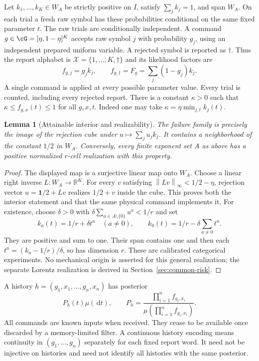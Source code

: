 \documentclass[11pt]{amsart}
\newtheorem{lemma}[theorem]{Lemma}
\theoremstyle{definition}\newtheorem{definition}[theorem]{Definition}
\theoremstyle{remark}\newtheorem{remark}[theorem]{Remark}
\newcommand{\R}{\mathbb R}\newcommand{\N}{\mathbb N}\newcommand{\C}{\mathbb C}
\newcommand{\one}{\mathbf 1}\newcommand{\dd}{\,\mathrm d}
\newcommand{\cX}{\mathcal X}\newcommand{\cS}{\mathcal S}
\newcommand{\norm}[1]{\left\lVert#1\right\rVert}
\begin{document}
Let $k_1,\ldots,k_K\in W_A$ be strictly positive on $I$, satisfy
$\sum_jk_j=1$, and span $W_A$. On each trial a fresh raw symbol has these
probabilities conditional on the same fixed parameter $t$. The raw trials
are conditionally independent. A command
$g\in\cG=[\eta,1-\eta]^K$ accepts raw symbol $j$ with probability $g_j$,
using an independent prepared uniform variable. A rejected symbol is
reported as $\dagger$. Thus the report alphabet is
$\cX=\{1,\ldots,K,\dagger\}$ and its likelihood factors are
\begin{equation}\label{eq:channel}
 f_{g,j}=g_jk_j,\qquad
 f_{g,\dagger}=F_g=\sum_j(1-g_j)k_j.
\end{equation}
A single command is applied at every possible parameter value. Every
trial is counted, including every rejected report. There is a constant
$\kappa>0$ such that $\kappa\le f_{g,x}(t)\le1$ for all $g,x,t$.
Indeed one may take $\kappa=\eta\min_{j,t}k_j(t)$.

\begin{lemma}[Attainable interior and realizability]\label{lem:interior}
The failure family is precisely the image of the rejection cube under
$u\mapsto\sum_ju_jk_j$. It contains a neighborhood of the constant $1/2$
in $W_A$. Conversely, every finite exponent set $A$ as above has a positive
normalized $r$-cell realization with this property.
\end{lemma}
\begin{proof}
The displayed map is a surjective linear map onto $W_A$. Choose a linear
right inverse $L:W_A\to\R^K$. For every $v$ satisfying
$\norm{Lv}_\infty<1/2-\eta$, rejection vector
$u=\one/2+Lv$ realizes $1/2+v$ inside the cube. This proves both the
interior statement and that the same physical command implements it.
For existence, choose $\delta>0$ with
$\delta\sum_{a\in A\setminus\{0\}}u^a<1/r$ and set
\[
 k_a(t)=1/r+\delta t^a\quad(a\ne0),\qquad
 k_0(t)=1/r-\delta\sum_{a\ne0}t^a.
\]
They are positive and sum to one. Their span contains one and then each
$t^a=(k_a-1/r)/\delta$, so has dimension $r$. These are calibrated
categorical experiments. No mechanical origin is asserted for this general
realization; the separate Lorentz realization is derived in
Section~\ref{sec:common-risk}.
\end{proof}

A history $h=(g_1,x_1,\ldots,g_n,x_n)$ has posterior
\begin{equation}\label{eq:posterior}
 P_h(t)\mu(\dd t),\qquad
 P_h=\frac{\prod_{i=1}^nf_{g_i,x_i}}{\mu(\prod_{i=1}^nf_{g_i,x_i})}.
\end{equation}
All commands are known inputs when received. They cease to be available
once discarded by a memory-limited filter. A continuous history encoding
means continuity in $(g_1,\ldots,g_n)$ separately for each fixed report
word. It need not be injective on histories and need not identify all
histories with the same posterior.
\end{document}
